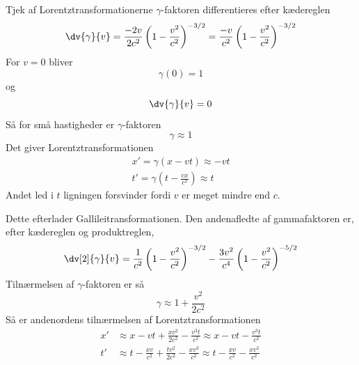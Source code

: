 \begin{opgave}{Tjek af Lorentztransformationerne}
    \opg 
     $\gamma$-faktoren differentieres efter kædereglen
     $$
     \dv{\gamma}{v}=\frac{-2v}{2c^2}\left(1-\frac{v^2}{c^2}\right)^{-3/2}=\frac{-v}{c^2}\left(1-\frac{v^2}{c^2}\right)^{-3/2}
     $$
     \opg
     For $v=0$ bliver 
     $$\gamma(0)=1$$
     og
     $$
     \dv{\gamma}{v}=0
     $$
     Så for små hastigheder er $\gamma$-faktoren
     $$
     \gamma\approx 1
     $$
     \opg 
     Det giver Lorentztransformationen
     \begin{align*}
         x'=\gamma(x-vt)\approx -vt\\
         t'=\gamma\left(t-\frac{vx}{c^2}\right)\approx t
     \end{align*}
     Andet led i $t$ ligningen forsvinder fordi $v$ er meget mindre end $c$.
     
     Dette efterlader Gallileitransformationen.
     \opg
     Den andenafledte af gammafaktoren er, efter kædereglen og produktreglen,
     $$
     \dv[2]{\gamma}{v}=\frac{1}{c^2}\left(1-\frac{v^2}{c^2}\right)^{-3/2}-\frac{3v^2}{c^4}\left(1-\frac{v^2}{c^2}\right)^{-5/2}
     $$
     Tilnærmelsen af $\gamma$-faktoren er så
     $$
     \gamma\approx 1+\frac{v^2}{2c^2}
     $$
     Så er andenordens tilnærmelsen af Lorentztransformationen
     \begin{align*}
         x'&\approx x-vt+\frac{xv^2}{2c^2}-\frac{v^3t}{c^2}\approx x-vt-\frac{v^3t}{c^2}\\
         t'&\approx t-\frac{xv}{c^2}+\frac{tv^2}{2c^2}-\frac{xv^3}{c^2}\approx t-\frac{xv}{c^2}-\frac{xv^3}{c^2}
     \end{align*}
\end{opgave}


